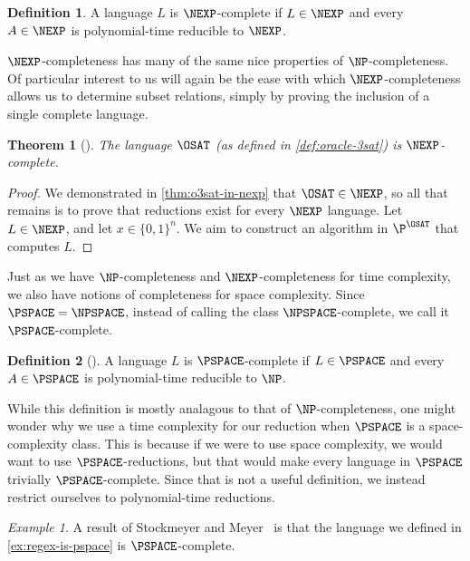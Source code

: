 \documentclass[english,12pt]{reedthesis}
\theoremstyle{plain}
\newtheorem{thm}{Theorem}[section]
\theoremstyle{definition}
\newtheorem{defn}[defn]{Definition}
\theoremstyle{remark}
\newtheorem{example}{Example}[thm]
\begin{document}
\begin{defn}\label{def:nexp-complete}
  A language $L$ is $\NEXP$-complete if $L \in \NEXP$ and every $A \in \NEXP$ is
  polynomial-time reducible to $\NEXP$.
\end{defn}

$\NEXP$-completeness has many of the same nice properties of $\NP$-completeness.
Of particular interest to us will again be the ease with which
$\NEXP$-completeness allows us to determine subset relations, simply by proving
the inclusion of a single complete language.

\begin{thm}[{\cite[Proposition 4.2]{BFL90}}]\label{thm:o3sat-nexp-complete}
  The language $\OSAT$ (as defined in \cref{def:oracle-3sat}) is
  $\NEXP$-complete.
\end{thm}

\begin{proof}
  We demonstrated in \cref{thm:o3sat-in-nexp} that $\OSAT \in \NEXP$, so all that
  remains is to prove that reductions exist for every $\NEXP$ language. Let
  $L \in \NEXP$, and let $x \in \{0, 1\}^{n}$. We aim to construct an algorithm in
  $\P^{\OSAT}$ that computes $L$.
\end{proof}

Just as we have $\NP$-completeness and $\NEXP$-completeness for time complexity,
we also have notions of completeness for space complexity. Since
$\PSPACE = \NPSPACE$, instead of calling the class $\NPSPACE$-complete, we call
it $\PSPACE$-complete.

\begin{defn}[{\cite[Def.\ 8.8]{Sip97}}]\label{def:pspace-complete}
  A language $L$ is $\PSPACE$-complete if $L \in \PSPACE$ and every $A \in \PSPACE$
  is polynomial-time reducible to $\NP$.
\end{defn}

While this definition is mostly analagous to that of $\NP$-completeness, one
might wonder why we use a time complexity for our reduction when $\PSPACE$ is a
space-complexity class. This is because if we were to use space complexity, we
would want to use $\PSPACE$-reductions, but that would make every language in
$\PSPACE$ trivially $\PSPACE$-complete. Since that is not a useful definition,
we instead restrict ourselves to polynomial-time reductions.

\begin{example}
  A result of Stockmeyer and Meyer~\cite{SM73} is that the language we defined
  in \cref{ex:regex-is-pspace} is $\PSPACE$-complete.
\end{example}
\end{document}
